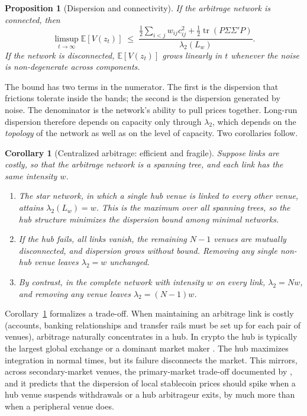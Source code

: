 \documentclass[12pt]{article}
\newtheorem{proposition}{Proposition}
\newtheorem{corollary}{Corollary}
\theoremstyle{definition}
\theoremstyle{remark}
\newcommand{\E}{\mathbb{E}}
\begin{document}
\begin{proposition}[Dispersion and connectivity]\label{prop:network}
If the arbitrage network is connected, then
\[
\limsup_{t\to\infty}\E[V(z_t)] \;\le\; \frac{\tfrac12\sum_{i<j}w_{ij}c_{ij}^2 + \tfrac12\operatorname{tr}(P\Sigma\Sigma'P)}{\lambda_2(L_w)} .
\]
If the network is disconnected, $\E[V(z_t)]$ grows linearly in $t$ whenever the noise is non-degenerate across components.
\end{proposition}

The bound has two terms in the numerator. The first is the dispersion that frictions tolerate inside the bands; the second is the dispersion generated by noise. The denominator is the network's ability to pull prices together. Long-run dispersion therefore depends on capacity only through $\lambda_2$, which depends on the \emph{topology} of the network as well as on the level of capacity. Two corollaries follow.

\begin{corollary}[Centralized arbitrage: efficient and fragile]\label{cor:hub}
Suppose links are costly, so that the arbitrage network is a spanning tree, and each link has the same intensity $w$.
\begin{enumerate}[label=(\alph*)]
\item The star network, in which a single hub venue is linked to every other venue, attains $\lambda_2(L_w)=w$. This is the maximum over all spanning trees, so the hub structure minimizes the dispersion bound among minimal networks.
\item If the hub fails, all links vanish, the remaining $N-1$ venues are mutually disconnected, and dispersion grows without bound. Removing any single non-hub venue leaves $\lambda_2=w$ unchanged.
\item By contrast, in the complete network with intensity $w$ on every link, $\lambda_2=Nw$, and removing any venue leaves $\lambda_2=(N-1)w$.
\end{enumerate}
\end{corollary}

Corollary~\ref{cor:hub} formalizes a trade-off. When maintaining an arbitrage link is costly (accounts, banking relationships and transfer rails must be set up for each pair of venues), arbitrage naturally concentrates in a hub. In crypto the hub is typically the largest global exchange or a dominant market maker \citep{hu2023competition}. The hub maximizes integration in normal times, but its failure disconnects the market. This mirrors, across secondary-market venues, the primary-market trade-off documented by \citet{ma2025stablecoin}, and it predicts that the dispersion of local stablecoin prices should spike when a hub venue suspends withdrawals or a hub arbitrageur exits, by much more than when a peripheral venue does.
\end{document}
